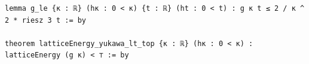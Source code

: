 \begin{Verbatim}[fontsize=\scriptsize,frame=single,framesep=1.5mm]
lemma g_le {κ : ℝ} (hκ : 0 < κ) {t : ℝ} (ht : 0 < t) : g κ t ≤ 2 / κ ^ 2 * riesz 3 t := by

theorem latticeEnergy_yukawa_lt_top {κ : ℝ} (hκ : 0 < κ) : latticeEnergy (g κ) < ⊤ := by
\end{Verbatim}

